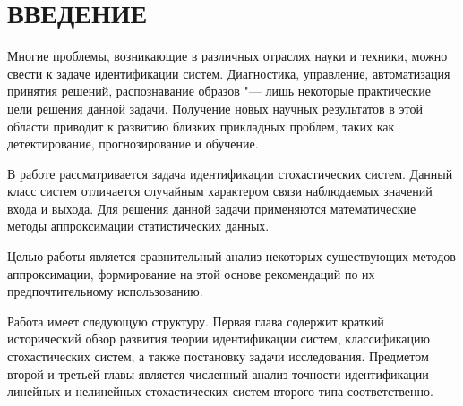 \chapter*{ВВЕДЕНИЕ}

Многие проблемы, возникающие в различных отраслях науки и техники,
можно свести к задаче идентификации систем.
Диагностика, управление, автоматизация принятия решений, распознавание образов
"--- лишь некоторые практические цели решения данной задачи.
Получение новых научных результатов в этой области приводит к
развитию близких прикладных проблем,
таких как детектирование, прогнозирование и обучение.

В работе рассматривается задача идентификации стохастических систем.
Данный класс систем отличается случайным характером связи наблюдаемых
значений входа и выхода.
Для решения данной задачи применяются математические методы
аппроксимации статистических данных.

Целью работы является сравнительный анализ некоторых существующих методов аппроксимации,
формирование на этой основе рекомендаций по их предпочтительному использованию.

Работа имеет следующую структуру.
Первая глава содержит краткий исторический обзор развития теории идентификации систем,
классификацию стохастических систем, а также постановку задачи исследования.
Предметом второй и третьей главы является численный анализ точности идентификации
линейных и нелинейных стохастических систем второго типа соответственно.